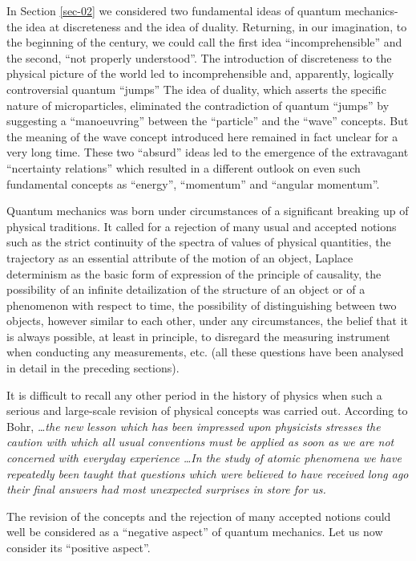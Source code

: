 \documentclass[a4paper,sfsidenotes,colorlinks=true]{tufte-book}
\numberwithin{equation}{section}
\numberwithin{figure}{section}
\begin{document}
In Section \ref{sec-02} we considered two fundamental ideas of quantum
mechanics-the idea at discreteness and the idea of duality. Returning,
in our imagination, to the beginning of the century, we could call the
first idea ``incomprehensible'' and the second, ``not properly
understood''. The introduction of discreteness to the physical picture
of the world led to incomprehensible and, apparently, logically
controversial quantum ``jumps'' The idea of duality, which asserts the
specific nature of microparticles, eliminated the contradiction of
quantum ``jumps'' by suggesting a ``manoeuvring'' between the
``particle'' and the ``wave'' concepts. But the meaning of the wave
concept introduced here remained in fact unclear for a very long
time. These two ``absurd'' ideas led to the emergence of the
extravagant ``ncertainty relations'' which resulted in a different
outlook on even such fundamental concepts as ``energy'', ``momentum''
and ``angular momentum''.


Quantum mechanics was born under circumstances of a significant breaking up of physical traditions. It called for a rejection of many usual and accepted notions such as the strict continuity of the spectra of values of physical quantities, the trajectory as an essential attribute of the motion of an object, Laplace determinism as the basic form of expression of the principle of causality, the possibility of an infinite detailization of the structure of an object or of a phenomenon with respect to time, the possibility of distinguishing between two objects, however similar to each other, under any circumstances, the belief that it is always possible, at least in principle, to disregard the measuring instrument when conducting any measurements, etc. (all these questions have been analysed in detail in the preceding sections).


It is difficult to recall any other period in the history of physics
when such a serious and large-scale revision of physical concepts was
carried out. According to Bohr, \emph{\ldots the new lesson which has
  been impressed upon physicists stresses the caution with which all
  usual conventions must be applied as soon as we are not concerned
  with everyday experience \ldots In the study of atomic phenomena we have repeatedly been taught that questions which were believed to have received long ago their final answers had most unexpected surprises in store for us.}

The  revision of the
concepts and the rejection of many accepted notions could well be
considered as a ``negative aspect'' of quantum mechanics. Let us now
consider its ``positive aspect''.
\end{document}
